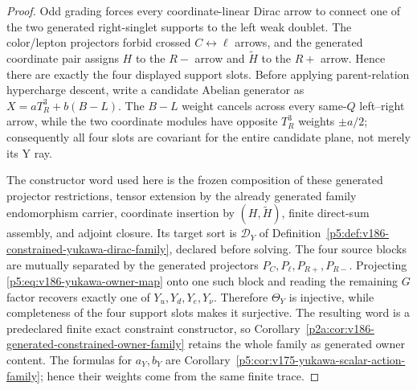 \documentclass[12pt,a4paper]{article}
\begin{document}
\begin{proof}
Odd grading forces every coordinate-linear Dirac arrow to connect one of
the two generated right-singlet supports to the left weak doublet.  The
color/lepton projectors forbid crossed $C\leftrightarrow\ell$ arrows, and the
generated coordinate pair assigns $H$ to the $R-$ arrow and $\widetilde H$
to the $R+$ arrow.  Hence there are exactly the four displayed support slots.
Before applying parent-relation hypercharge descent, write a candidate Abelian generator as
$X=aT_R^3+b(B-L)$.  The $B-L$ weight cancels across every same-$Q$
left--right arrow, while the two coordinate modules have opposite
$T_R^3$ weights $\pm a/2$; consequently all four slots are covariant for the
entire candidate plane, not merely its Y ray.

The constructor word used here is the frozen composition of these generated
projector restrictions, tensor extension by the already generated family
endomorphism carrier, coordinate insertion by $(H,\widetilde H)$, finite
direct-sum assembly, and adjoint closure.  Its target sort is
$\mathscr D_Y$ of
Definition~\ref{p5:def:v186-constrained-yukawa-dirac-family}, declared before
solving.  The four source blocks are mutually separated by the generated
projectors $P_C,P_\ell,P_{R+},P_{R-}$.  Projecting
\eqref{p5:eq:v186-yukawa-owner-map} onto one such block and reading the
remaining $G$ factor recovers exactly one of $Y_u,Y_d,Y_e,Y_\nu$.  Therefore
$\Theta_Y$ is injective, while completeness of the four support slots makes it
surjective.  The resulting word is a predeclared finite exact constraint
constructor, so
Corollary~\ref{p2a:cor:v186-generated-constrained-owner-family} retains the
whole family as generated owner content.  The formulas for $a_Y,b_Y$ are
Corollary~\ref{p5:cor:v175-yukawa-scalar-action-family}; hence their weights
come from the same finite trace.
\end{proof}
\end{document}
